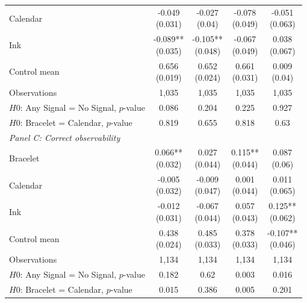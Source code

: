 {\begin{tabular}[t]{lcccc}
Calendar & \makecell[c]{-0.049\\{(0.031)}} & \makecell[c]{-0.027\\{(0.04)}} & \makecell[c]{-0.078\\{(0.049)}} & \makecell[c]{-0.051\\{(0.063)}}\\
Ink & \makecell[c]{-0.089**\\{(0.035)}} & \makecell[c]{-0.105**\\{(0.048)}} & \makecell[c]{-0.067\\{(0.049)}} & \makecell[c]{0.038\\{(0.067)}}\\
\midrule
Control mean & \makecell[c]{0.656\\{(0.019)}} & \makecell[c]{0.652\\{(0.024)}} & \makecell[c]{0.661\\{(0.031)}} & \makecell[c]{0.009\\{(0.04)}}\\
Observations & 1,035 & 1,035 & 1,035 & 1,035\\
$H0$: Any Signal = No Signal, $p$-value & 0.086 & 0.204 & 0.225 & 0.927\\
$H0$: Bracelet = Calendar, $p$-value & 0.819 & 0.655 & 0.818 & 0.63\\
\midrule
\multicolumn{5}{l}{\textit{Panel C: Correct observability}} \\
Bracelet & \makecell[c]{0.066**\\{(0.032)}} & \makecell[c]{0.027\\{(0.044)}} & \makecell[c]{0.115**\\{(0.044)}} & \makecell[c]{0.087\\{(0.06)}}\\
Calendar & \makecell[c]{-0.005\\{(0.032)}} & \makecell[c]{-0.009\\{(0.047)}} & \makecell[c]{0.001\\{(0.044)}} & \makecell[c]{0.011\\{(0.065)}}\\
Ink & \makecell[c]{-0.012\\{(0.031)}} & \makecell[c]{-0.067\\{(0.044)}} & \makecell[c]{0.057\\{(0.043)}} & \makecell[c]{0.125**\\{(0.062)}}\\
\midrule
Control mean & \makecell[c]{0.438\\{(0.024)}} & \makecell[c]{0.485\\{(0.033)}} & \makecell[c]{0.378\\{(0.033)}} & \makecell[c]{-0.107**\\{(0.046)}}\\
Observations & 1,134 & 1,134 & 1,134 & 1,134\\
$H0$: Any Signal = No Signal, $p$-value & 0.182 & 0.62 & 0.003 & 0.016\\
$H0$: Bracelet = Calendar, $p$-value & 0.015 & 0.386 & 0.005 & 0.201\\
\bottomrule
\end{tabular}}
